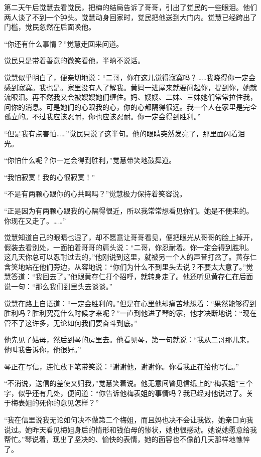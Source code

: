 \par 第二天午后觉慧去看觉民，把梅的结局告诉了哥哥，引出了觉民的一些眼泪。他们两人谈了不到一个钟头。觉慧动身回家时，觉民把他送到大门内。觉慧已经跨出了门槛，觉民忽然在后面唤他。
\par “你还有什么事情？”觉慧走回来问道。
\par 觉民只是带着善意的微笑看他，半晌不说话。
\par 觉慧似乎明白了，便亲切地说：“二哥，你在这儿觉得寂寞吗？……我晓得你一定会感到寂寞。我也是。家里没有人了解我。黄妈一进屋来就要问起你，提到你，她就流眼泪。再不然我又会被嫂嫂她们缠住。妈、嫂嫂、二妹、三妹她们常常拉住我，问你的消息。可是她们的心跟我的心，你的心都隔得很远。我一个人在家里是完全孤立的。不过我应该忍耐，你也应该忍耐。你一定会得到胜利。”
\par “但是我有点害怕……”觉民只说了这半句。他的眼睛突然发亮了，那里面闪着泪光。
\par “你怕什么呢？你一定会得到胜利，”觉慧带笑地鼓舞道。
\par “我怕寂寞！我的心很寂寞！”
\par “不是有两颗心跟你的心共鸣吗？”觉慧极力保持着笑容说。
\par “正是因为有两颗心跟我的心隔得很近，所以我常常想看见你们。她是不便来的。你现在又走了。……”
\par 觉慧知道自己的眼睛也湿了，却不愿意让哥哥看见，便把眼光从哥哥的脸上掉开，假装去看别处，一面拍着哥哥的肩头说：“二哥，你忍耐着。你一定会得到胜利。这几天你总可以忍耐过去的，”他刚说到这里，就被另一个人的声音打岔了。黄存仁含笑地站在他们旁边，从容地说：“你们为什么不到里头去说？不要太大意了。”觉慧答道：“我回去了。”他跟黄存仁打个招呼，就转身走了。他还听见黄存仁在后面说一句：“那么我们到里头去谈谈。”
\par 觉慧在路上自语道：“一定会胜利的。”但是在心里他却痛苦地想着：“果然能够得到胜利吗？胜利究竟什么时候才来呢？”一直到他进了琴的家，他才决断地说：“现在管不了这许多，无论如何我们要奋斗到底。”
\par 他先见了姑母，然后到琴的房里去。他看见琴，第一句就说：“我从二哥那儿来，他叫我告诉你，他很好。”
\par 琴正在写信，连忙放下笔带笑说：“谢谢他，谢谢你。你看我正在给他写信。”
\par “不消说，送信的差使又归我，”觉慧笑着说。他无意间瞥见信纸上的“梅表姐”三个字，似乎还有几处，便问道：“你告诉他梅表姐的事情吗？我已经对他说过了。关于梅表姐的死你的意见怎样？”
\par “我在信里说我无论如何决不做第二个梅姐，而且妈也决不会让我做，她亲口向我说过。她昨天看见梅姐身后的情形和钱伯母的惨状，她也很感动。她说她愿意给我帮忙。”琴说着，现出了坚决的、愉快的表情，她的面容也不像前几天那样地憔悴了。
